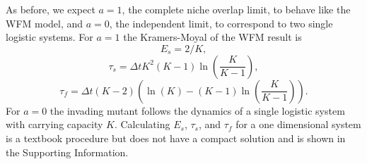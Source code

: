 
As before, we expect $a=1$, the complete niche overlap limit, to behave like the WFM model, and $a=0$, the independent limit, to correspond to two single logistic systems. 
For $a=1$ the Kramers-Moyal of the WFM result is \cite{Moran1962}
\begin{equation}
E_{s} = 2/K,
\end{equation}
\begin{equation}
\tau_{s} = \Delta t K^2(K-1)\ln\left(\frac{K}{K-1}\right), 
\end{equation}
\begin{equation}
\tau_{f} = \Delta t (K-2)\left( \ln\left(K\right) - (K-1)\ln\left(\frac{K}{K-1}\right)\right). 
\end{equation}
For $a=0$ the invading mutant follows the dynamics of a single logistic system with carrying capacity $K$. %
Calculating $E_s$, $\tau_{s}$, and $\tau_{f}$ for a one dimensional system is a textbook procedure \cite{Nisbet1982} but does not have a compact solution and is shown in the Supporting Information. %
